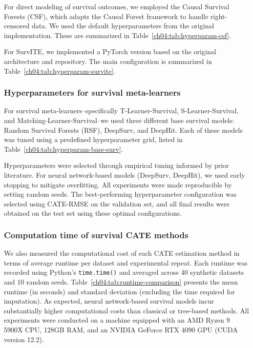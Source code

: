 For direct modeling of survival outcomes, we employed the Causal Survival Forests (CSF), which adapts the Causal Forest framework to handle right-censored data.
We used the default hyperparameters from the original implementation.
These are summarized in Table~\ref{ch04:tab:hyperparam-csf}.





For SurvITE, we implemented a PyTorch version based on the original architecture and repository.
The main configuration is summarized in Table~\ref{ch04:tab:hyperparam-survite}. %








\subsubsection{Hyperparameters for survival meta-learners}

{\raggedright For survival meta-learners--specifically T-Learner-Survival, S-Learner-Survival, and Matching-\allowbreak Learner-Survival--we used three different base survival models: Random Survival Forests (RSF), DeepSurv, and DeepHit. Each of these models was tuned using a predefined hyperparameter grid, listed in Table~\ref{ch04:tab:hyperparam-base-surv}.\par}





Hyperparameters were selected through empirical tuning informed by prior literature.
For neural network-based models (DeepSurv, DeepHit), we used early stopping to mitigate overfitting.
All experiments were made reproducible by setting random seeds.
The best-performing hyperparameter configuration was selected using CATE-RMSE on the validation set, and all final results were obtained on the test set using these optimal configurations.


\subsubsection{Computation time of survival CATE methods}

We also measured the computational cost of each CATE estimation method in terms of average runtime per dataset and experimental repeat.
Each runtime was recorded using Python’s \texttt{time.time()} and averaged across 40 synthetic datasets and 10 random seeds.
Table~\ref{ch04:tab:runtime-comparison} presents the mean runtime (in seconds) and standard deviation (excluding the time required for imputation). 
As expected, neural network-based survival models incur substantially higher computational costs than classical or tree-based methods.
All experiments were conducted on a machine equipped with an AMD Ryzen 9 5900X CPU, 128GB RAM, and an NVIDIA GeForce RTX 4090 GPU (CUDA version 12.2).









